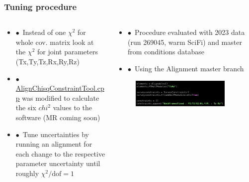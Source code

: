 \documentclass[aspectratio=1610, 12pt]{beamer}
\begin{document}
\begin{frame}\frametitle{Tuning procedure}
  \begin{columns}
    \begin{column}[c]{0.48\textwidth}
      \begin{itemize}
        \item $\bullet$\, Instead of one $\chi^2$ for whole cov. matrix \to look at the $\chi^2$ for joint parameters (Tx,Ty,Tz,Rx,Ry,Rz)
        \item $\bullet$\, \href{https://gitlab.cern.ch/lhcb/Alignment/-/blob/master/Alignment/TAlignment/src/AlignChisqConstraintTool.cpp}{AlignChisqConstraintTool.cpp} was modified to  calculate the six $chi^2$ values to the software (MR coming soon)
        \item $\bullet$\, Tune uncertainties by running an alignment for each change to the respective parameter uncertainty until roughly $\chi^2 / \text{dof} = 1$
      \end{itemize}
    \end{column}
    \begin{column}[c]{0.48\textwidth}
      \begin{itemize}
        \item $\bullet$\, Procedure evaluated with 2023 data (run 269045, warm SciFi) and master from conditions database
        \item $\bullet$\, Using the Alignment master branch
      \end{itemize}
      \begin{figure}
        \includegraphics[width=0.9\textwidth]{plots/config_joint_constraint.png}
      \end{figure}
    \end{column}
  \end{columns}
\end{frame}
\end{document}
